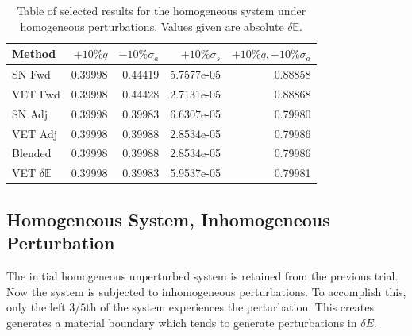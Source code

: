 \documentclass[12pt]{report}
\newcommand{\Edd}{\mathbb{E}}
\newcommand{\sigs}{\sigma_s}
\newcommand{\siga}{\sigma_a}
\begin{document}
\begin{table}[H]
\label{TableT1}
\centering
  \begin{tabular}{| l | r | r | r | r |}
    \hline
    Method  &  $+10\% q $  & $-10\% \siga $ & $+10\% \sigs $ & $+10\% q,-10\% \siga$ \\ \hline
     SN Fwd 			&0.39998 &0.44419 &5.7577e-05 & 0.88858\\ \hline
     VET Fwd			&0.39998 &0.44428 &2.7131e-05 &0.88868\\ \hline
     SN Adj			&0.39998 &0.39983 &6.6307e-05 &0.79980\\ \hline
     VET Adj 			&0.39998 &0.39988 &2.8534e-05 &0.79986\\ \hline
     Blended 			&0.39998 &0.39988 &2.8534e-05 &0.79986\\ \hline
     VET $\delta \Edd$ 	&0.39998 &0.39983 &5.9537e-05 &0.79981\\ \hline
    \end{tabular}
  \caption{Table of selected results for the homogeneous system under homogeneous perturbations. Values given are absolute $\delta \Edd$. }
\end{table}


\subsection{Homogeneous System, Inhomogeneous Perturbation}
The initial homogeneous unperturbed system is retained from the previous trial. Now the system is subjected to inhomogeneous perturbations. To accomplish this, only the left $3/5$th of the system experiences the perturbation. This creates generates a material boundary which tends to generate perturbations in $\delta E$.
\end{document}
